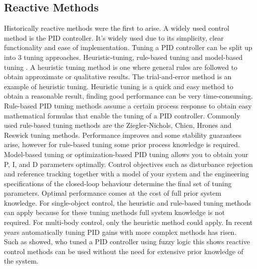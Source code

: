 \subsection{Reactive Methods}
\label{subsection: reactive_methods}
Historically reactive methods were the first to arise. A widely used control method is the \ac{PID} controller. It's widely used due to its simplicity, clear functionality and ease of implementation. Tuning a \ac{PID} controller can be split up into 3 tuning approaches. Heuristic-tuning, rule-based tuning and model-based tuning \cite{tools_explore_2022}. A heuristic tuning method is one where general rules are followed to obtain approximate or qualitative results. The trial-and-error method is an example of heuristic tuning. Heuristic tuning is a quick and easy method to obtain a reasonable result, finding good performance can be very time-consuming. Rule-based \ac{PID} tuning methods assume a certain process response to obtain easy mathematical formulas that enable the tuning of a \ac{PID} controller. Commonly used rule-based tuning methods are the Ziegler-Nichols, Chien, Hrones and Reswick tuning methods. Performance improves and some stability guarantees arise, however for rule-based tuning some prior process knowledge is required. Model-based tuning or optimization-based \ac{PID} tuning allows you to obtain your P, I, and D parameters optimally. Control objectives such as disturbance rejection and reference tracking together with a model of your system and the engineering specifications of the closed-loop behaviour determine the final set of tuning parameters. Optimal performance comes at the cost of full prior system knowledge. For single-object control, the heuristic and rule-based tuning methods can apply because for these tuning methods full system knowledge is not required. For multi-body control, only the heuristic method could apply. In recent years automatically tuning \ac{PID} gains with more complex methods has risen. Such as \cite{ahn_online_2009} showed, who tuned a \ac{PID} controller using fuzzy logic this shows reactive control methods can be used without the need for extensive prior knowledge of the system. \\

